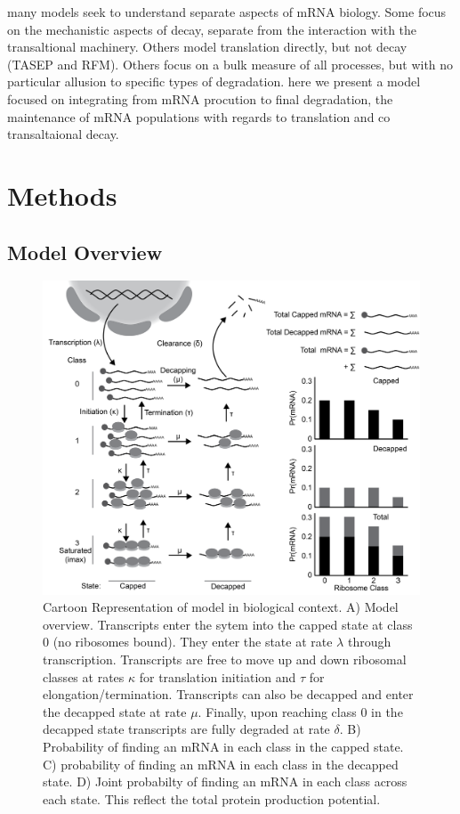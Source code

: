 \documentclass[review]{elsarticle}
\begin{document}
many models seek to understand separate aspects of mRNA biology. Some focus on the mechanistic aspects of decay, separate from the interaction with the transaltional machinery. Others model translation directly, but not decay (TASEP and RFM). Others focus on a bulk measure of all processes, but with no particular allusion to specific types of degradation. here we present a model focused on integrating from mRNA procution to final degradation, the maintenance of mRNA populations with regards to translation and co transaltaional decay.



\section{Methods}\label{sec:description}
\subsection{Model Overview}
\begin{figure}[!ht]
\centering
\includegraphics[width=150mm]{Images/Figure1_biomodel_V3.png}
\caption{Cartoon Representation of model in biological context. A) Model overview. Transcripts enter the sytem into the capped state at class 0 (no ribosomes bound). They enter the state at rate $\lambda$ through transcription. Transcripts are free to move up and down ribosomal classes at rates $\kappa$ for translation initiation and $\tau$ for elongation/termination. Transcripts can also be decapped and enter the decapped state at rate $\mu$. Finally, upon reaching class 0 in the decapped state transcripts are fully degraded at rate $\delta$. B) Probability of finding an mRNA in each class in the capped state. C) probability of finding an mRNA in each class in the decapped state. D) Joint probabilty of finding an mRNA in each class across each state. This reflect the total protein production potential.}
\end{figure}
\clearpage
\end{document}
